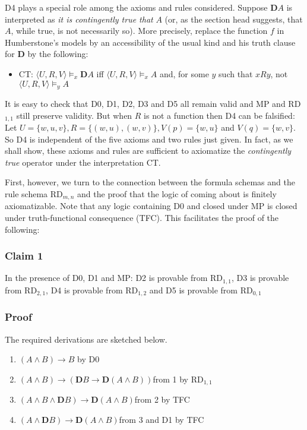 \documentclass[
  11pt,
  letterpaper,
  DIV=11,
  numbers=noendperiod,
  twoside]{scrartcl}
\providecommand{\tightlist}{%
  \setlength{\itemsep}{0pt}\setlength{\parskip}{0pt}}
\begin{document}
D4 plays a special role among the axioms and rules considered. Suppose
\(\mathbf{D}{A}\) is interpreted as \emph{it is contingently true that}
\(A\) (or, as the section head suggests, that \(A\), while true, is not
necessarily so). More precisely, replace the function \(f\) in
Humberstone's models by an accessibility of the usual kind and his truth
clause for \(\mathbf{D}\) by the following:

\begin{itemize}
\tightlist
\item
  CT: \(\langle U,R,V\!\rangle \models _x \mathbf{D}A\) iff
  \(\langle U,R,V\!\rangle \models _x A\) and, for some \(y\) such that
  \(xRy\), not \(\langle U,R,V\!\rangle \models _y A\)
\end{itemize}

It is easy to check that D0, D1, D2, D3 and D5 all remain valid and MP
and RD\(_{1,1}\) still preserve validity. But when \(R\) is not a
function then D4 can be falsified: Let
\(U=\{w,u,v\}, R=\{(w,u),(w,v)\}, V(p)=\{w,u\}\) and \(V(q)=\{w,v\}\).
So D4 is independent of the five axioms and two rules just given. In
fact, as we shall show, these axioms and rules are sufficient to
axiomatize the \emph{contingently true} operator under the
interpretation CT.

First, however, we turn to the connection between the formula schemas
and the rule schema RD\(_{m,n}\) and the proof that the logic of coming
about is finitely axiomatizable. Note that any logic containing D0 and
closed under MP is closed under truth-functional consequence (TFC). This
facilitates the proof of the following:

\subsubsection*{Claim 1}\label{claim-1}

In the presence of D0, D1 and MP: D2 is provable from RD\(_{1,1}\), D3
is provable from RD\(_{2,1}\), D4 is provable from RD\(_{1,2}\) and D5
is provable from RD\(_{0,1}\)

\subsubsection*{Proof}\label{proof-6}

The required derivations are sketched below.

\begin{enumerate}
\def\labelenumi{\arabic{enumi}.}
\tightlist
\item
  \((A\wedge B)\rightarrow B\) by D0
\item
  \((A\wedge B)\rightarrow (\mathbf{D}B\rightarrow \mathbf{D}(A\wedge B))\)from
  1 by RD\(_{1,1}\)
\item
  \((A\wedge B\wedge \mathbf{D}B)\rightarrow \mathbf{D}(A\wedge B)\)from
  2 by TFC
\item
  \((A\wedge \mathbf{D}B)\rightarrow \mathbf{D}(A\wedge B)\)from 3 and
  D1 by TFC
\end{enumerate}
\end{document}
